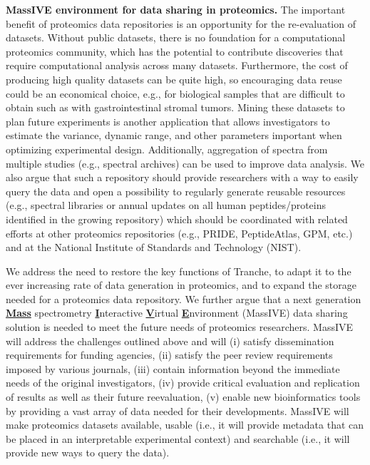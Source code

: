 \documentclass[arial,11pt]{article}
\begin{document}
{\bf MassIVE environment for data sharing in proteomics.} The important benefit of proteomics data repositories is an opportunity for the re-evaluation of datasets. Without public datasets, there is no foundation for a computational proteomics community, which has the potential to contribute discoveries that require computational analysis across many datasets. Furthermore, the cost of producing high quality datasets can be quite high, so encouraging data reuse could be an economical choice, e.g., for biological samples that are difficult to obtain such as with gastrointestinal stromal tumors. Mining these datasets to plan future experiments is another application that allows investigators to estimate the variance, dynamic range, and other parameters important when optimizing experimental design. Additionally, aggregation of spectra from multiple studies (e.g., spectral archives) can be used to improve data analysis. We also argue that such a repository should provide researchers with a way to easily query the data and open a possibility to regularly generate reusable resources (e.g., spectral libraries or annual updates on all human peptides/proteins identified in the growing repository) which should be coordinated with related efforts at other proteomics repositories (e.g., PRIDE, PeptideAtlas, GPM, etc.) and at the National Institute of Standards and Technology (NIST).

We address the need to restore the key functions of Tranche, to adapt it to the ever increasing rate of data generation in proteomics, and to expand the storage needed for a proteomics data repository. We further argue that a next generation \underline{\bf Mass} spectrometry \underline{\bf I}nteractive \underline{\bf V}irtual \underline{\bf E}nvironment (MassIVE) data sharing solution is needed to meet the future needs of proteomics researchers. MassIVE will address the challenges outlined above and will (i) satisfy dissemination requirements for funding agencies, (ii) satisfy the peer review requirements imposed by various journals, (iii) contain information beyond the immediate needs of the original investigators, (iv) provide critical evaluation and replication of results as well as their future reevaluation, (v) enable new bioinformatics tools by providing a vast array of data needed for their  developments. MassIVE will make proteomics datasets available, usable (i.e., it will provide metadata that can be placed in an interpretable experimental context) and searchable (i.e., it will provide new  ways to query the data).
\end{document}
